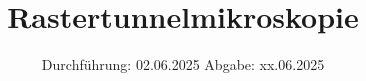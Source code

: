 

\subject{V42}
\title{Rastertunnelmikroskopie}
\date{%
  Durchführung: 02.06.2025
  \hspace{3em}
  Abgabe: xx.06.2025
}



\maketitle
\thispagestyle{empty}
\tableofcontents
\newpage






\printbibliography{}
\appendix
\setcounter{secnumdepth}{0}

